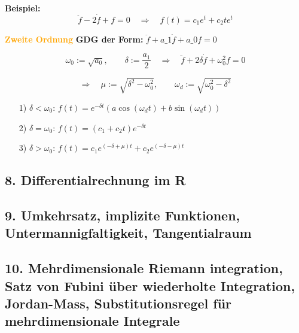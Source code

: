 \textbf{Beispiel:} \quad
\[
\ddot{f} - 2\dot{f} + f = 0 \quad \Rightarrow \quad f(t) = c_1 e^t + c_2 t e^t
\]

\vspace{1em}

\textcolor{orange}{\textbf{Zweite Ordnung}} \quad
\textbf{GDG der Form:} \quad $\ddot{f} + a\_1 \dot{f} + a\_0 f = 0$ \qquad {}

\[
\omega_0 := \sqrt{a_0}, \qquad \delta := \frac{a_1}{2}
\quad \Rightarrow \quad
\ddot{f} + 2\delta \dot{f} + \omega_0^2 f = 0
\]

\[
\Rightarrow \quad \mu := \sqrt{\delta^2 - \omega_0^2}, \qquad \omega_d := \sqrt{\omega_0^2 - \delta^2}
\]

\begin{itemize}
  \item[1)] \( \delta < \omega_0 \): \quad
    \( f(t) = e^{-\delta t} \left( a \cos(\omega_d t) + b \sin(\omega_d t) \right) \)

  \item[2)] \( \delta = \omega_0 \): \quad
    \( f(t) = (c_1 + c_2 t) e^{-\delta t} \)

  \item[3)] \( \delta > \omega_0 \): \quad
    \( f(t) = c_1 e^{(-\delta + \mu)t} + c_2 e^{(-\delta - \mu)t} \)
\end{itemize}


\subsection{8. Differentialrechnung im R}

\subsection{9. Umkehrsatz, implizite Funktionen, Untermannigfaltigkeit, Tangentialraum}

\subsection{10. Mehrdimensionale Riemann integration, Satz von Fubini über wiederholte Integration, Jordan-Mass, Substitutionsregel für mehrdimensionale Integrale}


